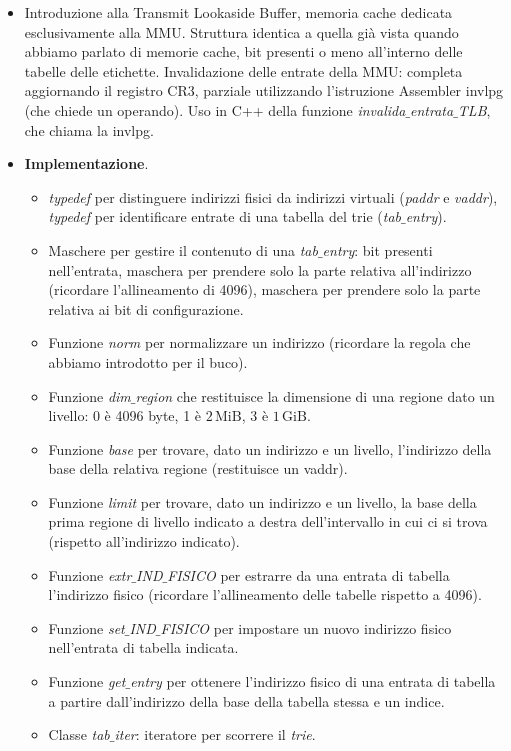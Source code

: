 \documentclass[11pt]{report}
\theoremstyle{definition}
\begin{document}
\begin{itemize}
\begin{itemize}
		\item Introduzione alla Transmit Lookaside Buffer, memoria cache dedicata esclusivamente alla MMU. Struttura identica a quella già vista quando abbiamo parlato di memorie cache, bit presenti o meno all'interno delle tabelle delle etichette. Invalidazione delle entrate della MMU: completa aggiornando il registro CR3, parziale utilizzando l'istruzione Assembler invlpg (che chiede un operando). Uso in C++ della funzione \emph{invalida$\_$entrata$\_$TLB}, che chiama la invlpg.
		\item \textbf{Implementazione}.
		\begin{itemize}
			\item \emph{typedef} per distinguere indirizzi fisici da indirizzi virtuali (\emph{paddr} e \emph{vaddr}), \emph{typedef} per identificare entrate di una tabella del trie (\emph{tab$\_$entry}).
			\item Maschere per gestire il contenuto di una \emph{tab$\_$entry}: bit presenti nell'entrata, maschera per prendere solo la parte relativa all'indirizzo (ricordare l'allineamento di 4096), maschera per prendere solo la parte relativa ai bit di configurazione.
			\item Funzione \emph{norm} per normalizzare un indirizzo (ricordare la regola che abbiamo introdotto per il buco).
			\item Funzione \emph{dim$\_$region} che restituisce la dimensione di una regione dato un livello: $0$ è 4096 byte, 1 è $2\,\text{MiB}$, 3 è $1\,\text{GiB}$.
			\item Funzione \emph{base} per trovare, dato un indirizzo e un livello, l'indirizzo della base della relativa regione (restituisce un vaddr).
			\item Funzione \emph{limit} per trovare, dato un indirizzo e un livello, la base della prima regione di livello indicato a destra dell'intervallo in cui ci si trova (rispetto all'indirizzo indicato).
			\item Funzione \emph{extr$\_$IND$\_$FISICO} per estrarre da una entrata di tabella l'indirizzo fisico (ricordare l'allineamento delle tabelle rispetto a 4096). 
			\item Funzione \emph{set$\_$IND$\_$FISICO} per impostare un nuovo indirizzo fisico nell'entrata di tabella indicata.
			\item Funzione \emph{get$\_$entry} per ottenere l'indirizzo fisico di una entrata di tabella a partire dall'indirizzo della base della tabella stessa e un indice.
			\item Classe \emph{tab$\_$iter}: iteratore per scorrere il \emph{trie}. 

\end{itemize}
\end{itemize}
\end{itemize}
\end{document}
